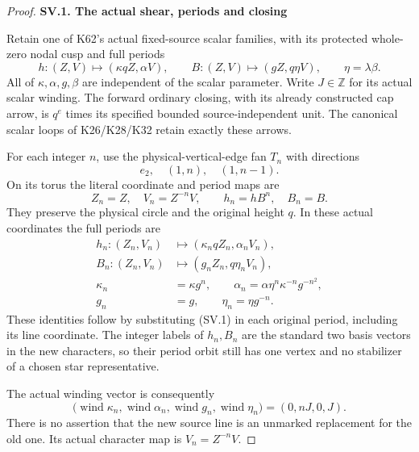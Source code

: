 \begin{proof}
\par

\medskip\noindent\textbf{SV.1. The actual shear, periods and closing}

\par\nobreak

Retain one of K62's actual fixed-source scalar families,
with its protected whole-zero nodal cusp and full periods
\[
 h:(Z,V)\mapsto(\kappa qZ,\alpha V),\qquad
 B:(Z,V)\mapsto(gZ,q\eta V),\qquad \eta=\lambda\beta.
\]
All of \(\kappa,\alpha,g,\beta\) are independent of the
scalar parameter. Write \(J\in\mathbb Z\) for its actual
scalar winding. The forward ordinary closing, with its
already constructed cap arrow, is \(q^e\) times its
specified bounded source-independent unit. The canonical
scalar loops of K26/K28/K32 retain exactly these arrows.

For each integer \(n\), use the physical-vertical-edge
fan \(T_n\) with directions
\[
             e_2,\quad (1,n),\quad(1,n-1).
\]
On its torus the literal coordinate and period maps are
\[
 Z_n=Z,\quad V_n=Z^{-n}V,\qquad h_n=hB^n,\quad B_n=B.
                                                        \tag{SV.1}
\]
They preserve the physical circle and the original height
\(q\). In these actual coordinates the full periods are
\[
 \begin{split}
 h_n:(Z_n,V_n)&\mapsto(\kappa_n qZ_n,\alpha_n V_n),\\
 B_n:(Z_n,V_n)&\mapsto(g_nZ_n,q\eta_nV_n),\\
 \kappa_n&=\kappa g^n,\qquad
 \alpha_n=\alpha\eta^n\kappa^{-n}g^{-n^2},\\
 g_n&=g,\qquad \eta_n=\eta g^{-n}.
 \end{split}                                          \tag{SV.2}
\]
These identities follow by substituting (SV.1) in each
original period, including its line coordinate. The
integer labels of \(h_n,B_n\) are the standard two basis
vectors in the new characters, so their period orbit
still has one vertex and no stabilizer of a chosen
star representative.

The actual winding vector is consequently
\[
 \bigl(\operatorname{wind}\kappa_n,
       \operatorname{wind}\alpha_n,
       \operatorname{wind}g_n,
       \operatorname{wind}\eta_n\bigr)
                    =(0,nJ,0,J).                    \tag{SV.3}
\]
There is no assertion that the new source line is an
unmarked replacement for the old one. Its actual
character map is \(V_n=Z^{-n}V\).


\end{proof}
